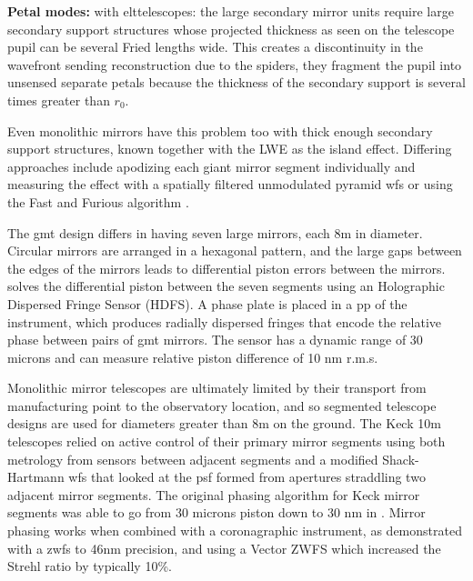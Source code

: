 \documentclass[letterpaper]{ar-1col}
\begin{document}
{\bf Petal modes: } with \ac{elt}telescopes: the large secondary mirror units require large secondary support structures whose projected thickness as seen on the telescope pupil can be several Fried lengths wide.
%
This creates a discontinuity in the wavefront sending reconstruction due to the spiders, they fragment the pupil into unsensed separate petals because the thickness of the secondary support is several times greater than $r_0$.

Even monolithic mirrors have this problem too with thick enough secondary support structures, known together with the LWE as the island effect.
%
Differing approaches include apodizing each giant mirror segment individually \citep[Redundant Apodized Pupils; RAP ][]{Leboulleux22,Leboulleux22a} and  measuring the effect with a spatially filtered unmodulated pyramid \ac{wfs} \citep{Levraud24} or using the Fast and Furious algorithm  \citep[ demonstrated on Subaru/SCExAO in][]{Bos20}.

The \ac{gmt} design differs in having seven large mirrors, each 8m in diameter.
%
Circular mirrors are arranged in a hexagonal pattern, and the large gaps between the edges of the mirrors leads to differential piston errors between the mirrors.
%
\citet{Haffert22,Quiros-Pacheco22} solves the differential piston between the seven segments using an Holographic Dispersed Fringe Sensor (HDFS).
%
A phase plate is placed in a \ac{pp} of the instrument, which produces radially dispersed fringes that encode the relative phase between pairs of \ac{gmt} mirrors.
%
The sensor has a dynamic range of 30 microns and can measure relative piston difference of 10 nm r.m.s.

 
Monolithic mirror telescopes are ultimately limited by their transport from manufacturing point to the observatory location, and so segmented telescope designs are used for diameters greater than 8m on the ground.
The Keck 10m telescopes relied on active control of their primary mirror segments using both metrology from sensors between adjacent segments and a modified Shack-Hartmann \ac{wfs} that looked at the \ac{psf} formed from apertures straddling two adjacent mirror segments.
%
The original phasing algorithm for Keck mirror segments was able to go from 30 microns piston down to 30 nm in \citet{Chanan98,Chanan00}.
%
Mirror phasing works when combined with a coronagraphic instrument, as \citep{vanKooten22} demonstrated with a \ac{zwfs} to 46nm precision, and \citep{Salama24} using a Vector ZWFS which increased the Strehl ratio by typically 10\%.
\end{document}
